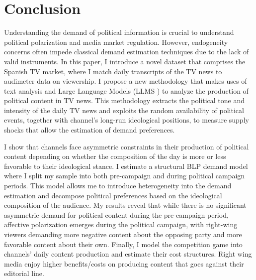 \documentclass[12pt]{article}
\begin{document}
	
	\section{Conclusion}
	
	Understanding the demand of political information is crucial to understand political polarization and media market regulation. However, endogeneity concerns often  impede classical demand estimation techniques due to the lack of valid instruments. In this paper,  I introduce a novel dataset that comprises the Spanish TV market, where I match daily transcripts of the TV news to audimeter data on viewership. I propose a new methodology that makes uses of text analysis and Large Language Models (LLMS ) to analyze the production of political content in TV news. This methodology extracts the political tone and intensity of the daily TV news and  exploits the random availability of political events, together with channel's long-run ideological positions, to measure supply shocks that allow the estimation of  demand preferences.
	
	I show that channels face asymmetric constraints  in their production of political content depending on whether the composition of the day is more or less favorable to their ideological stance. I estimate a structural BLP demand model where I split my sample into both pre-campaign and during political campaign periods. This model allows me to introduce heterogeneity into the demand estimation and decompose political preferences based on the  ideological composition of the audience. My results reveal that while there is no significant asymmetric demand for political content during the pre-campaign period, affective polarization emerges during the political campaign, with right-wing viewers demanding more negative content about the opposing party and more favorable content about their own. Finally, I model the competition game into channels' daily content production and estimate their cost structures. Right wing media enjoy higher benefits/costs on producing content that goes against their editorial line.
	
	
	
	
	
	
	\clearpage
	
	\pagestyle{plain}  
	
	
	
	
\end{document}
